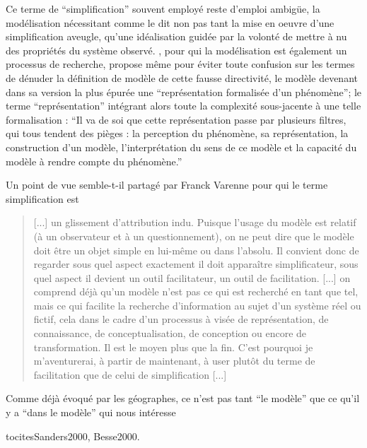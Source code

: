 Ce terme de \enquote{simplification} souvent employé reste d'emploi ambigüe, la modélisation nécessitant comme le dit \textcite{Haggett1965} non pas tant la mise en oeuvre d'une simplification aveugle, qu'une idéalisation guidée par la volonté de mettre à nu des propriétés du système observé. \textcite{Brunet2000}, pour qui la modélisation est également un processus de recherche, propose même pour éviter toute confusion sur les termes de dénuder la définition de modèle de cette fausse directivité, le modèle devenant dans sa version la plus épurée une \enquote{représentation formalisée d'un phénomène}; le terme \enquote{représentation} intégrant alors toute la complexité sous-jacente à une telle formalisation : \enquote{Il va de soi que cette représentation passe par plusieurs filtres, qui tous tendent des pièges : la perception du phénomène, sa représentation, la construction d'un modèle, l'interprétation du sens de ce modèle et la capacité du modèle à rendre compte du phénomène.}

Un point de vue semble-t-il partagé par Franck Varenne pour qui le terme simplification est \blockquote[{\cite{Varenne2008}}]{[...] un glissement d’attribution indu. Puisque l’usage du modèle est relatif (à un observateur et à un questionnement), on ne peut dire que le modèle doit être un objet simple en lui-même ou dans l’absolu. Il convient donc de regarder sous quel aspect exactement il doit apparaître simplificateur, sous quel aspect il devient un outil facilitateur, un outil de facilitation. [...] on comprend déjà qu’un modèle n’est pas ce qui est recherché en tant que tel, mais ce qui facilite la recherche d’information au sujet d’un système réel ou fictif, cela dans le cadre d’un processus à visée de représentation, de connaissance, de conceptualisation, de conception ou encore de transformation. Il est le moyen plus que la fin. C’est pourquoi je m’aventurerai, à partir de maintenant, à user plutôt du terme de facilitation que de celui de simplification [...]}

Comme déjà évoqué par les géographes, ce n'est pas tant \enquote{le modèle} que ce qu'il y a \enquote{dans le modèle} qui nous intéresse \author{names}tocites{Sanders2000, Besse2000}.

